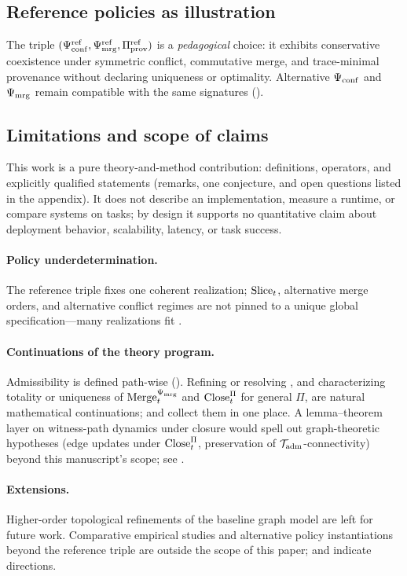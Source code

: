 \subsection{Reference policies as illustration}
\label{subsec:disc-reference}

The triple $(\Psi_{\mathrm{conf}}^{\mathrm{ref}},\Psi_{\mathrm{mrg}}^{\mathrm{ref}},\Pi_{\mathrm{prov}}^{\mathrm{ref}})$ is a \emph{pedagogical} choice: it exhibits conservative coexistence under symmetric conflict, commutative merge, and trace-minimal provenance without declaring uniqueness or optimality.
Alternative $\Psi_{\mathrm{conf}}$ and $\Psi_{\mathrm{mrg}}$ remain compatible with the same signatures ().

\subsection{Limitations and scope of claims}
\label{sec:limitations}

This work is a pure theory-and-method contribution: definitions, operators, and explicitly qualified statements (remarks, one conjecture, and open questions listed in the appendix).
It does not describe an implementation, measure a runtime, or compare systems on tasks; by design it supports no quantitative claim about deployment behavior, scalability, latency, or task success.

\paragraph{Policy underdetermination.}
The reference triple fixes one coherent realization; $\mathrm{Slice}_t$, alternative merge orders, and alternative conflict regimes are not pinned to a unique global specification---many realizations fit .

\paragraph{Continuations of the theory program.}
Admissibility is defined path-wise ().
Refining or resolving , and characterizing totality or uniqueness of $\mathrm{Merge}_t^{\Psi_{\mathrm{mrg}}}$ and $\mathrm{Close}_t^{\Pi}$ for general $\Pi$, are natural mathematical continuations;  and  collect them in one place.
A lemma--theorem layer on witness-path dynamics under closure would spell out graph-theoretic hypotheses (edge updates under $\mathrm{Close}_t^{\Pi}$, preservation of $\mathcal{T}_{\mathrm{adm}}$-connectivity) beyond this manuscript's scope; see .

\paragraph{Extensions.}
Higher-order topological refinements of the baseline graph model are left for future work.
Comparative empirical studies and alternative policy instantiations beyond the reference triple are outside the scope of this paper;  and  indicate directions.
